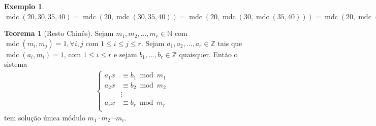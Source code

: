 \documentclass[a4paper,11pt,twoside, leqno]{article}
\DeclareMathOperator{\mdc}{mdc}
\theoremstyle{definition}
\newtheorem{theorem}{Teorema}[section]
\newtheorem*{example}{Exemplo}
\begin{document}
\begin{example}
	$\mdc(20,30,35,40) = \mdc(20,\mdc(30,35,40)) = \mdc(20,\mdc(30,\mdc(35,40))) = \mdc(20, \mdc(30,5)) = \mdc(20,5) = 5.$
\end{example}
\begin{theorem}[Resto Chinês]
	Sejam $m_1, m_2, \dots, m_r\in\mathbb{N}$ com $\mdc(m_i, m_j) = 1, \forall i,j$ com $1\leq i\leq j\leq r$. Sejam $a_1, a_2, \dots, a_r\in\mathbb{Z}$ tais que $\mdc(a_i, m_i) = 1$, com $1\leq i\leq r$ e sejam $b_1, \dots, b_r\in\mathbb{Z}$ quaisquer. Então o sistema
	\begin{align*}
	\begin{cases}
	a_1x &\equiv b_1\bmod m_1 \\
	a_2x &\equiv b_2\bmod m_2 \\
	&\vdots \\
	a_rx &\equiv b_r\bmod m_r \\
	\end{cases}
	\end{align*}
	tem solução única módulo $m_1\cdot m_2\cdots m_r$.
\end{theorem}
\end{document}
